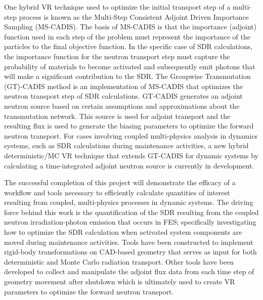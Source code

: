 \documentclass[12pt]{article}
\begin{document}
One hybrid VR technique used to optimize the initial transport step of a
multi-step process is known as 
the Multi-Step Consistent Adjoint Driven Importance Sampling
(MS-CADIS). 
 The basis of MS-CADIS is that the importance (adjoint) function used
in each step of the problem must represent the importance of the particles to
the final objective function.  
In the specific case of SDR calculations, the importance function for the neutron transport step
must capture the probability of materials to become activated and subsequently emit photons that
will make a significant contribution to the SDR.
The Groupwise Transmutation (GT)-CADIS method 
is an implementation of MS-CADIS
that optimizes the neutron transport step of SDR calculations.
GT-CADIS generates an adjoint
neutron source based on certain assumptions and approximations about the
transmutation network.  
This source is used for adjoint transport and the resulting flux is used to
generate the biasing parameters to optimize the forward neutron transport.
For cases involving coupled multi-physics analysis in dynamics systems, such as SDR calculations
during maintenance activities,
a new hybrid deterministic/MC VR technique that extends 
GT-CADIS for dynamic systems by calculating a time-integrated adjoint
neutron source is currently in development.

The successful completion of this project will demonstrate the efficacy of a workflow and tools
necessary to efficiently calculate quantities of interest resulting from
coupled, multi-physics processes in dynamic systems.  
The driving force behind this work is the quantification of the
SDR resulting from the coupled neutron
irradiation-photon emission that occurs in FES;
specifically investigating how to optimize the SDR calculation when %
activated system components are moved during maintenance activities.
Tools have been constructed to implement 
rigid-body transformations on CAD-based geometry that serves as input for both
deterministic and Monte Carlo radiation transport.
Other tools have been developed to collect and manipulate the adjoint
flux data from each time step of geometry movement after shutdown which is
ultimately used to create VR parameters to optimize the forward neutron transport.
\end{document}
